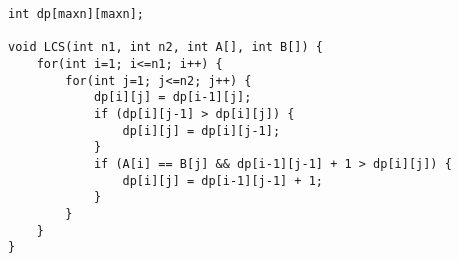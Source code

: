 \begin{lstlisting}
int dp[maxn][maxn];

void LCS(int n1, int n2, int A[], int B[]) {
	for(int i=1; i<=n1; i++) {
		for(int j=1; j<=n2; j++) {
			dp[i][j] = dp[i-1][j];
			if (dp[i][j-1] > dp[i][j]) {
				dp[i][j] = dp[i][j-1];
			}
			if (A[i] == B[j] && dp[i-1][j-1] + 1 > dp[i][j]) {
				dp[i][j] = dp[i-1][j-1] + 1;
			}
		}
	}
}
\end{lstlisting}